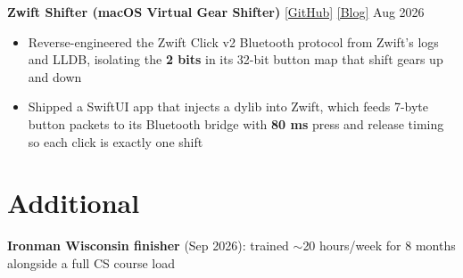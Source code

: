 \documentclass[11pt]{article}
\begin{document}
\vspace{1pt}
\noindent\textbf{Zwift Shifter (macOS Virtual Gear Shifter)} \href{https://github.com/DimitriChrysafis/ZwiftShifter}{[GitHub]} \href{https://dimitrichrysafis.github.io/#post/post12.md}{[Blog]} \hfill \textcolor{experienceblue}{\small Aug 2026}
\begin{itemize}
\item Reverse-engineered the Zwift Click v2 Bluetooth protocol from Zwift's logs and LLDB, isolating the \textbf{2 bits} in its 32-bit button map that shift gears up and down
\item Shipped a SwiftUI app that injects a dylib into Zwift, which feeds 7-byte button packets to its Bluetooth bridge with \textbf{80 ms} press and release timing so each click is exactly one shift
\end{itemize}

\section*{\textcolor{modernblue}{\large Additional}}
\noindent\small{\textbf{Ironman Wisconsin finisher} (Sep 2026): trained $\sim$20 hours/week for 8 months alongside a full CS course load}\normalsize
\end{document}
